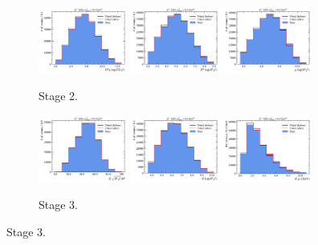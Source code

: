 \begin{figure}[htb]
    \begin{subfigure}{\textwidth}
        \centering
        \includegraphics[width=0.32\textwidth]{./figs-mc-correction/reweighting-final/plot_step1-Dst_iso-b_log_fd_chi2.pdf}
        \includegraphics[width=0.32\textwidth]{./figs-mc-correction/reweighting-final/plot_step1-Dst_iso-d0_log_ip_chi2.pdf}
        \includegraphics[width=0.32\textwidth]{./figs-mc-correction/reweighting-final/plot_step1-Dst_iso-mu_log_ip_chi2.pdf}
        \caption{Stage 2.}
    \end{subfigure}

    \begin{subfigure}{\textwidth}
        \centering
        \includegraphics[width=0.32\textwidth]{./figs-mc-correction/reweighting-final/plot_step2-Dst_iso-k_comp.pdf}
        \includegraphics[width=0.32\textwidth]{./figs-mc-correction/reweighting-final/plot_step2-Dst_iso-k_log_ip_chi2.pdf}
        \includegraphics[width=0.32\textwidth]{./figs-mc-correction/reweighting-final/plot_step2-Dst_iso-k_pt.pdf}
        \caption{Stage 3.}
    \end{subfigure}


\end{figure}
